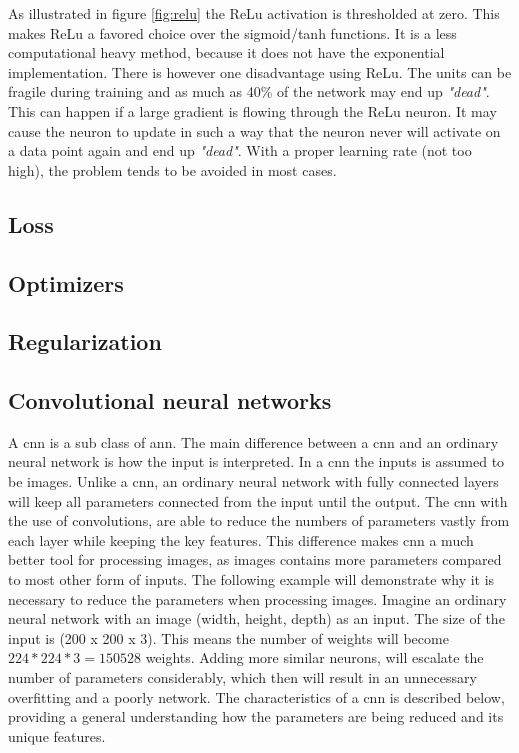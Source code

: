 \documentclass[USenglish]{ifimaster}  %
\begin{document}
As illustrated in figure \ref{fig:relu} the ReLu activation is thresholded at zero. This makes ReLu a favored choice over the sigmoid/tanh functions. It is a less computational heavy method, because it does not have the exponential implementation. There is however one disadvantage using ReLu. The units can be fragile during training and as much as 40\% of the network may end up \textit{"dead"}. This can happen if a large gradient is flowing through the ReLu neuron. It may cause the neuron to update in such a way that the neuron never will activate on a data point again and end up \textit{"dead"}. With a proper learning rate (not too high), the problem tends to be avoided in most cases.

\subsection{Loss}

\subsection{Optimizers}

\subsection{Regularization}


\subsection{Convolutional neural networks}
A \ac{cnn} is a sub class of \ac{ann}. The main difference between a \ac{cnn} and an ordinary neural network is how the input is interpreted. In a \ac{cnn} the inputs is assumed to be images. 
\newline
\newline
Unlike a \ac{cnn}, an ordinary neural network with fully connected layers will keep all parameters connected from the input until the output. The \ac{cnn} with the use of convolutions, are able to reduce the numbers of parameters vastly from each layer while keeping the key features. This difference makes \ac{cnn} a much better tool for processing images, as images contains more parameters compared to most other form of inputs. 
\newline
\newline
The following example will demonstrate why it is necessary to reduce the parameters when processing images. Imagine an ordinary neural network with an image (width, height, depth) as an input. The size of the input is (200 x 200 x 3). This means the number of weights will become $224 * 224 * 3 = 150528$ weights. Adding more similar neurons, will escalate the number of parameters considerably, which then will result in an unnecessary overfitting and a poorly network.
\newline
\newline
The characteristics of a \ac{cnn} is described below, providing a general understanding how the parameters are being reduced and its unique features.
\end{document}
